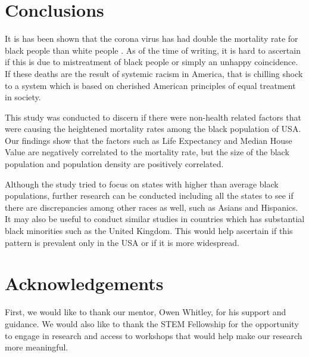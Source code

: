 \documentclass[10pt,twocolumn,letterpaper]{article}
\begin{document}
\section*{Conclusions}

It is has been shown that the corona virus has had double the mortality rate for black people than white people \cite{apm}. As of the time of writing, it is hard to ascertain if this is due to mistreatment of black people or simply an unhappy coincidence. If these deaths are the result of systemic racism in America, that is chilling shock to a system which is based on cherished American principles of equal treatment in society. 

This study was conducted to discern if there were non-health related factors that were causing the heightened mortality rates among the black population of USA. Our findings show that the factors such as Life Expectancy and Median House Value are negatively correlated to the mortality rate, but the size of the black population and population density are positively correlated. 

Although the study tried to focus on states with higher than average black populations, further research can be conducted including all the states to see if there are discrepancies among other races as well, such as Asians and Hispanics. It may also be useful to conduct similar studies in countries which has substantial black minorities such as the United Kingdom. This would help ascertain if this pattern is prevalent only in the USA or if it is more widespread. 


\section*{Acknowledgements}
First, we would like to thank our mentor, Owen Whitley, for his support and guidance. We would also like to thank the STEM Fellowship for the opportunity to engage in research and access to workshops that would help make our research more meaningful. 



\end{document}
